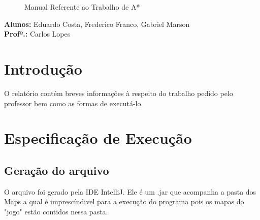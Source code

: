 \documentclass[hidelinks,12pt]{article}
\newcommand{\bigicon}[1]{\texttt{[image: \#1]}}
\begin{document}
\pagestyle{fancy}


\lhead{\bigicon{Figures/ufu}}
\rhead{\bigicon{Figures/facom}}
\lfoot{}
\cfoot{}
\rfoot{}
\vspace*{8.5cm}
\begin{figure}[!h]
	\centering
	\Huge{Manual Referente ao Trabalho de A*}
\end{figure}

\vspace{5cm}
\noindent\textbf{Alunos:} Eduardo Costa, Frederico Franco, Gabriel Marson\\
\textbf{Profº.:} Carlos Lopes



\newpage
\fancyhead[C]{}
\fancyhead[R]{}
\fancyhead[L]{\leftmark}
\fancyfoot{}
\fancyfoot[C]{\hspace{1.5cm}\thepage}


{\let\thefootnote\relax{}}

\newpage

\section{Introdução}

	O relatório contém breves informações à respeito do trabalho pedido pelo professor bem como as formas de executá-lo.

\section{Especificação de Execução}
	
	
	\subsection{Geração do arquivo}
	
		O arquivo foi gerado pela IDE IntelliJ. Ele é um .jar que acompanha a pasta dos Maps a qual é imprescíndivel para a execução do programa pois os mapas do "jogo" estão contidos nessa pasta.
	
\end{document}
